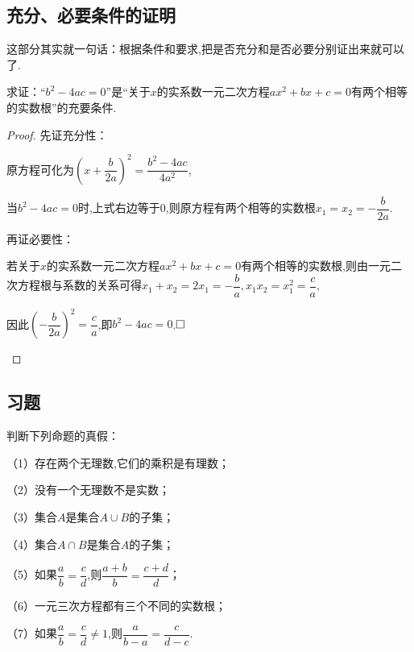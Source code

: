 \documentclass[lang=cn,math=cm,chinesefont=nofont,11pt,scheme=chinese,twocol]{elegantbook}
\begin{document}
\subsection{充分、必要条件的证明}

这部分其实就一句话：根据条件和要求,把是否充分和是否必要分别证出来就可以了.

\begin{example}\label{HS2FZ_lkb1_P26.1}
  求证：“$b^2-4ac=0$”是“关于$x$的实系数一元二次方程$ax^2+bx+c=0$有两个相等的实数根”的充要条件.
\end{example}

\begin{proof}
  先证充分性：

  原方程可化为$\left(x+\dfrac{b}{2a}\right)^{2}=\dfrac{b^{2}-4ac}{4a^{2}}$,

  当$b^2-4ac=0$时,上式右边等于0,则原方程有两个相等的实数根$x_1=x_2=-\dfrac{b}{2a}$.

  再证必要性：
  
\begin{spacing}{1.8}
  若关于$x$的实系数一元二次方程$ax^2+bx+c=0$有两个相等的实数根,则由一元二次方程根与系数的关系可得$x_{1}+x_{2}=2x_{1}=-\dfrac{b}{a},x_{1}x_{2}=x_{1}^{2}=\dfrac{c}{a},$

  因此$\left(-\dfrac{b}{2a}\right)^{2}=\dfrac{c}{a}$,即$b^2-4ac=0$.$\hfill\square$
\end{spacing}

\end{proof}

\subsection{习题}

\begin{exercise}\label{2017RJB_bx1_P26}
  判断下列命题的真假：

  （1）存在两个无理数,它们的乘积是有理数；

  （2）没有一个无理数不是实数；

  （3）集合$A$是集合$A\cup B$的子集；

  （4）集合$A\cap B$是集合$A$的子集；

\begin{spacing}{2.0}
    （5）如果$\dfrac ab=\dfrac cd$,则$\dfrac{a+b}b=\dfrac{c+d}{d}$；

  （6）一元三次方程都有三个不同的实数根；
  
  （7）如果$\dfrac ab=\dfrac cd\neq 1$,则$\dfrac a{b-a}=\dfrac c{d-c}$.
\end{spacing}

\end{exercise}
\end{document}

